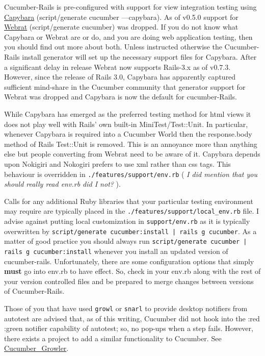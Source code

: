 Cucumber-Rails is pre-configured with support for view integration testing using  \href{http://github.com/jnicklas/capybara}{Capybara} (script/generate  cucumber ---capybara).  As of v0.5.0 support for \href{http://github.com/brynary/webrat}{Webrat} (script/generate cucumber) was dropped. If you do not know what Capybara or Webrat are or do,  and you are doing web application testing, then you should find out more about both.  Unless instructed otherwise the Cucumber-Rails install generator will set up the necessary support files for Capybara.  After a significant delay in release Webrat now supports Rails-3.x as of v0.7.3.  However, since the release of Rails 3.0, Capybara has apparently captured sufficient mind-share in the Cucumber community that generator support for Webrat was dropped and Capybara is now the default for cucumber-Rails.

While Capybara has emerged as the preferred testing method for html views it does not play well with Rails' own built-in MiniTest/Test::Unit.  In particular, whenever Capybara is required into a Cucumber World then the response.body method of Rails Test::Unit is removed.  This is an annoyance more than anything else but people converting from Webrat need to be aware of it.  Capybara depends upon Nokigiri and Nokogiri prefers to use xml rather than css tags.  This behaviour is overridden in \verb+./features/support/env.rb+ ( \emph{I did mention that you should really read env.rb did I not?} ).

Calls for any additional Ruby libraries that your particular testing environment may require are typically placed in the \verb+./features/support/local_env.rb+ file.  I advise against putting local customization in \verb+support/env.rb+ as it is typically overwritten by \verb+script/generate cucumber:install | rails g cucumber+.  As a matter of good practice you should always run \verb+script/generate cucumber | rails g cucumber:install+ whenever you install an updated version of cucumber-rails. Unfortunately, there are some configuration options that simply \textbf{must} go into env.rb to have effect.  So, check in your env.rb along with the rest of your version controlled files and be prepared to merge changes between versions of Cucumber-Rails.

Those of you that have used \verb+growl+ or \verb+snarl+ to provide desktop notifiers from autotest are advised that, as of this writing, Cucumber did not hook into the :red :green notifier capability of autotest;  so, no pop-ups when a step fails.  However, there exists a project to add a similar functionality to Cucumber. See \href{http://github.com/paolodona/cucumber_growler/tree/master}{Cucumber\_Growler}.

